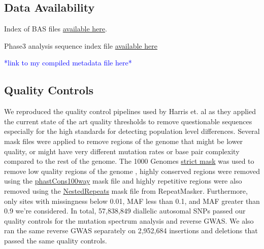 \documentclass[9pt,lineno]{elife}
\newcommand{\todo}[1]{\textcolor{blue}{*#1*}}
\begin{document}
\subsection{Data Availability}

Index of BAS files \href{http://ftp.1000genomes.ebi.ac.uk/vol1/ftp/data_collections/1000_genomes_project/1000genomes.low_coverage.GRCh38DH.alignment.index}{available here}.

Phase3 analysis sequence index file  \href{http://ftp.1000genomes.ebi.ac.uk/vol1/ftp/phase3/20130502.phase3.analysis.sequence.index}{available here} 

\todo{link to my compiled metadata file here}

\subsection{Quality Controls}
We reproduced the quality control pipelines used by Harris et. al as they applied the current state of the art quality thresholds to remove questionable sequences especially for the high standards for detecting population level differences. 
Several mask files were applied to remove regions of the genome that might be lower quality, or might have very different mutation rates or base pair complexity compared to the rest of the genome. 
The  1000 Genomes \href{http://ftp.1000genomes.ebi.ac.uk/vol1/ftp/release/20130502/supporting/accessible_genome_masks/20141020.strict_mask.whole_genome.bed}{strict mask} was used to remove low quality regions of the genome , highly conserved regions were removed using the \href{http://hgdownload.cse.ucsc.edu/goldenPath/hg19/database/phastConsElements100way.txt.gz}{phastCons100way} mask file and highly repetitive regions were also removed using the \href{http://hgdownload.cse.ucsc.edu/goldenpath/hg19/database/nestedRepeats.txt.gz}{NestedRepeats} mask file from RepeatMasker. 
Furthermore, only sites with missingness below 0.01, MAF less than 0.1, and MAF greater than 0.9 we're considered.
In total, 57,838,849 diallelic autosomal SNPs passed our quality controls for the mutation spectrum analysis and reverse GWAS. 
We also ran the same reverse GWAS separately on 2,952,684 insertions and deletions that passed the same quality controls.
\end{document}
